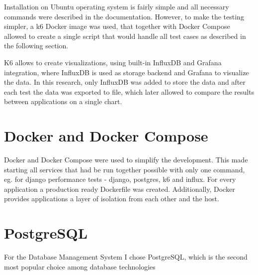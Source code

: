 Installation on Ubuntu operating system is fairly simple and all necessary commands were described in the documentation. However, to make the testing simpler, a k6 Docker image was used, that together with Docker Compose allowed to create a single script that would handle all test cases as described in the following section.

K6 allows to create visualizations, using built-in InfluxDB and Grafana integration, where InfluxDB is used as storage backend and Grafana to visualize the data. In this research, only InfluxDB was added to store the data and after each test the data was exported to file, which later allowed to compare the results between applications on a single chart.

\section{Docker and Docker Compose}

Docker and Docker Compose were used to simplify the development. This made starting all services that had be run together possible with only one command, eg. for django performance tests - django, postgres, k6 and influx. For every application a production ready Dockerfile was created. Additionally, Docker provides applications a layer of isolation from each other and the host.

\section{PostgreSQL}

For the Database Management System I chose PostgreSQL, which is the second most popular choice among database technologies %